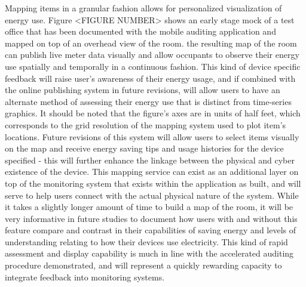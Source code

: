 Mapping items in a granular fashion allows for personalized visualization of energy use. Figure <FIGURE NUMBER> shows an early stage mock of a test office that has been documented with the mobile auditing application and mapped on top of an overhead view of the room. the resulting map of the room can publish live meter data visually and allow occupants to observe their energy use spatially and temporally in a continuous fashion. This kind of device specific feedback will raise user's awareness of their energy usage, and if combined with the online publishing system in future revisions, will allow users to have an alternate method of assessing their energy use that is distinct from time-series graphics.  It should be noted that the figure's axes are in units of half feet, which corresponds to the grid resolution of the mapping system used to plot item's locations. Future revisions of this system will allow users to select items visually on the map and receive energy saving tips and usage histories for the device specified - this will further enhance the linkage between the physical and cyber existence of the device. 
	This mapping service can exist as an additional layer on top of the monitoring system that exists within the application as built, and will serve to help users connect with the actual physical nature of the system. While it takes a slightly longer amount of time to build a map of the room, it will be very informative in future studies to document how users with and without this feature compare and contrast in their capabilities of saving energy and levels of understanding relating to how their devices use electricity. This kind of rapid assessment and display capability is much in line with the accelerated auditing procedure demonstrated, and will represent a quickly rewarding capacity to integrate feedback into monitoring systems. 